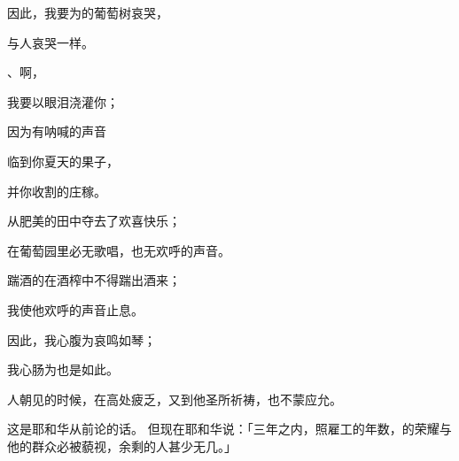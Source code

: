 {\par }{\Q {}因此，我要为{}的葡萄树哀哭，
\par }{\Q 与{}人哀哭一样。
\par }{、{}啊，
\par }{\Q 我要以眼泪浇灌你；
\par }{\Q 因为有{}呐喊的声音
\par }{\Q 临到你夏天的果子，
\par }{\Q 并你收割的庄稼。
\par }{\Q {}从肥美的田中夺去了欢喜快乐；
\par }{\Q 在葡萄园里必无歌唱，也无欢呼的声音。
\par }{\Q 踹酒的在酒榨中不得踹出酒来；
\par }{\Q 我使他欢呼的声音止息。
\par }{\Q {}因此，我心腹为{}哀鸣如琴；
\par }{\Q 我心肠为{}也是如此。
\par }{\PP {}人朝见的时候，在高处疲乏，又到他圣所祈祷，也不蒙应允。
\par }{\PP {}这是耶和华从前论{}的话。
但现在耶和华说：「三年之内，照雇工的年数，{}的荣耀与他的群众必被藐视，余剩的人甚少无几。」

}
